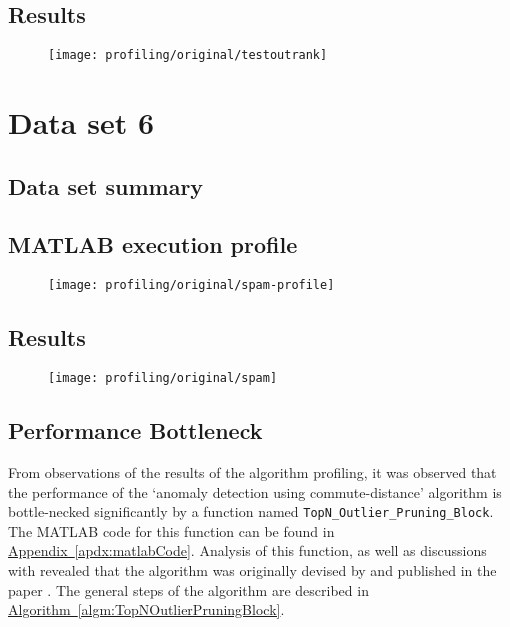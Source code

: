 \subsection{Results}
\begin{figure}[H]
	\centering
	\texttt{[image: profiling/original/testoutrank]}
\end{figure}

\section{Data set 6}

\subsection{Data set summary}

\subsection{MATLAB execution profile}
\begin{figure}[H]
	\centering
	\texttt{[image: profiling/original/spam-profile]}
\end{figure}

\subsection{Results}
\begin{figure}[H]
	\centering
	\texttt{[image: profiling/original/spam]}
\end{figure}

\subsection{Performance Bottleneck}
\label{sec:algorithmPerformanceBottleneck}
From observations of the results of the algorithm profiling, it was observed 
that the performance of the `anomaly detection using commute-distance' 
algorithm is bottle-necked significantly by a function named 
\verb+TopN_Outlier_Pruning_Block+. The MATLAB code for this function can be 
found in \hyperref[apdx:matlabCode]{Appendix~\ref{apdx:matlabCode}}. Analysis of
this function, as well as discussions with \citeauthor{Khoa:2012} revealed that
the algorithm was originally devised by \citeauthor{Bay:2003} and published in
the paper . The general steps of the algorithm are described
in \hyperref[algm:TopNOutlierPruningBlock]
{Algorithm~\ref{algm:TopNOutlierPruningBlock}}.

